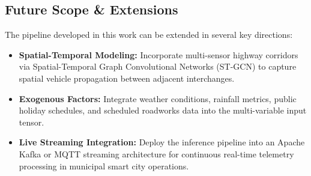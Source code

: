 \documentclass[12pt,a4paper]{article}
\begin{document}
\subsection{Future Scope \& Extensions}
The pipeline developed in this work can be extended in several key directions:
\begin{itemize}
    \item \textbf{Spatial-Temporal Modeling:} Incorporate multi-sensor highway corridors via Spatial-Temporal Graph Convolutional Networks (ST-GCN) to capture spatial vehicle propagation between adjacent interchanges.
    \item \textbf{Exogenous Factors:} Integrate weather conditions, rainfall metrics, public holiday schedules, and scheduled roadworks data into the multi-variable input tensor.
    \item \textbf{Live Streaming Integration:} Deploy the inference pipeline into an Apache Kafka or MQTT streaming architecture for continuous real-time telemetry processing in municipal smart city operations.
\end{itemize}
\end{document}
